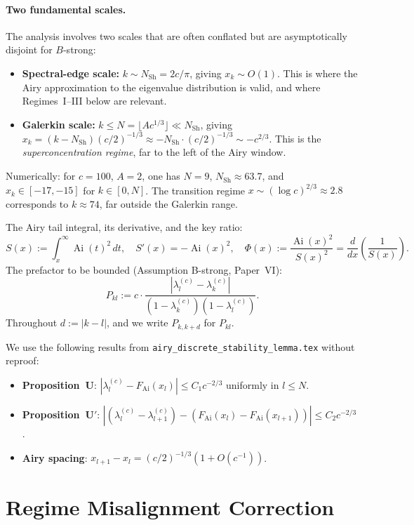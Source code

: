 \documentclass[12pt,a4paper]{article}
\newcommand{\Ai}{\operatorname{Ai}}
\newcommand{\lam}[1]{\lambda_{#1}^{(c)}}
\newcommand{\FAi}{F_{\mathrm{Ai}}}
\begin{document}
\paragraph{Two fundamental scales.}
The analysis involves two scales that are often conflated
but are asymptotically disjoint for $B$-strong:
\begin{itemize}[nosep]
  \item \textbf{Spectral-edge scale:} $k \sim N_{\mathrm{Sh}} = 2c/\pi$,
        giving $x_k \sim O(1)$.  This is where the Airy approximation
        to the eigenvalue distribution is valid, and where Regimes~I--III
        below are relevant.
  \item \textbf{Galerkin scale:} $k \leq N = \lfloor Ac^{1/3}\rfloor
        \ll N_{\mathrm{Sh}}$, giving $x_k = (k - N_{\mathrm{Sh}})(c/2)^{-1/3}
        \approx -N_{\mathrm{Sh}} \cdot (c/2)^{-1/3} \sim -c^{2/3}$.
        This is the \emph{superconcentration regime}, far to the left
        of the Airy window.
\end{itemize}
Numerically: for $c = 100$, $A = 2$, one has $N = 9$,
$N_{\mathrm{Sh}} \approx 63.7$, and $x_k \in [-17, -15]$
for $k \in [0, N]$.  The transition regime $x \sim (\log c)^{2/3}
\approx 2.8$ corresponds to $k \approx 74$, far outside the
Galerkin range.

\medskip
The Airy tail integral, its derivative, and the key ratio:
\[
  S(x) := \int_x^\infty \Ai(t)^2\,dt,
  \quad S'(x) = -\Ai(x)^2,
  \quad \Phi(x) := \frac{\Ai(x)^2}{S(x)^2}
  = \frac{d}{dx}\!\left(\frac{1}{S(x)}\right).
\]
The prefactor to be bounded (Assumption B-strong, Paper~VI):
\[
  P_{kl} := c \cdot \frac{|\lam{l} - \lam{k}|}{(1-\lam{k})(1-\lam{l})}.
\]
Throughout $d := |k-l|$, and we write $P_{k,k+d}$ for $P_{kl}$.

\medskip\noindent
We use the following results from \texttt{airy\_discrete\_stability\_lemma.tex}
without reproof:
\begin{itemize}[nosep]
  \item \textbf{Proposition~U}: $|\lam{l} - \FAi(x_l)| \leq C_1 c^{-2/3}$
        uniformly in $l \leq N$.
  \item \textbf{Proposition~U$'$}:
        $|(\lam{l}-\lam{l+1}) - (\FAi(x_l)-\FAi(x_{l+1}))|
        \leq C_2 c^{-2/3}$.
  \item \textbf{Airy spacing}: $x_{l+1} - x_l = (c/2)^{-1/3}(1+O(c^{-1}))$.
\end{itemize}

\section{Regime Misalignment Correction}
\label{sec:misalignment}
\end{document}
